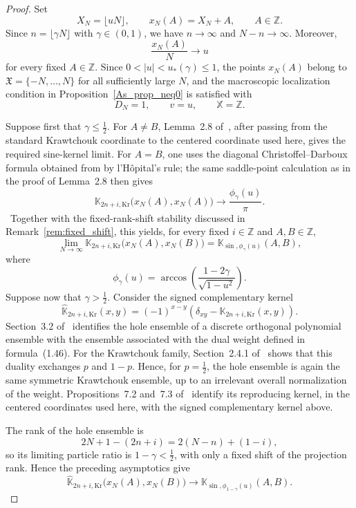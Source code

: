 \documentclass[reqno,11pt]{amsart}
\newcommand{\ZZ}{\mathbb{Z}}
\theoremstyle{plain}
\theoremstyle{definition}
\numberwithin{equation}{section}
\begin{document}
\begin{proof}
Set
\[
X_N=\lfloor uN\rfloor,
\qquad
x_N(A)=X_N+A,
\qquad
A\in\ZZ.
\]
Since \(n=\lfloor\gamma N\rfloor\) with \(\gamma\in(0,1)\), we have
\(n\to\infty\) and \(N-n\to\infty\). Moreover,
\[
\frac{x_N(A)}{N}\longrightarrow u
\]
for every fixed \(A\in\ZZ\). Since
\(0<|u|<u_\ast(\gamma)\leq1\), the points \(x_N(A)\) belong to
\(\mathfrak X=\{-N,\ldots,N\}\) for all sufficiently large \(N\),
and the macroscopic localization condition in
Proposition~\ref{As_prop_neq0} is satisfied with
\[
D_N=1,
\qquad
v=u,
\qquad
\mathbb X=\ZZ.
\]

Suppose first that \(\gamma\leq\frac12\). 
For $A\neq B$, Lemma~2.8 of~\cite{johansson2002non}, after passing from the standard Krawtchouk coordinate to the centered coordinate used here, gives the required sine-kernel limit. For $A=B$, one uses the diagonal Christoffel--Darboux formula obtained from \cite[formula~(2.7)]{johansson2002non} by l'Hôpital's rule; the same saddle-point calculation as in the proof of Lemma~2.8 then gives
\[
\mathbb K_{2n+i,\mathrm{Kr}}
\bigl(x_N(A),x_N(A)\bigr)
\longrightarrow
\frac{\phi_\gamma(u)}{\pi}.
\]
\
Together with the fixed-rank-shift stability discussed in Remark~\ref{rem:fixed_shift}, this yields, for every fixed
\(i\in\ZZ\) and \(A,B\in\ZZ\),
\[
\lim_{N\to\infty}
\mathbb K_{2n+i,\mathrm{Kr}}
\bigl(x_N(A),x_N(B)\bigr)
=
\mathbb K_{\sin,\phi_\gamma(u)}(A,B),
\]
where
\[
\phi_\gamma(u)
=
\arccos\left(
\frac{1-2\gamma}{\sqrt{1-u^2}}
\right).
\]
Suppose now that $\gamma>\frac12$. Consider the signed complementary kernel
\[
\widehat{\mathbb K}_{2n+i,\mathrm{Kr}}(x,y)
=
(-1)^{x-y}
\left(
\delta_{xy}-\mathbb K_{2n+i,\mathrm{Kr}}(x,y)
\right).
\]
Section~3.2 of~\cite{baik2007discrete} identifies the hole ensemble of a discrete orthogonal polynomial ensemble with the ensemble associated with the dual weight defined in formula~(1.46). For the Krawtchouk family, Section~2.4.1 of~\cite{baik2007discrete} shows that this duality exchanges $p$ and $1-p$. Hence, for $p=\frac12$, the hole ensemble is again the same symmetric Krawtchouk ensemble, up to an irrelevant overall normalization of the weight. Propositions~7.2 and~7.3 of~\cite{baik2007discrete} identify its reproducing kernel, in the centered coordinates used here, with the signed complementary kernel above.

The rank of the hole ensemble is
\[
2N+1-(2n+i)
=
2(N-n)+(1-i),
\]
so its limiting particle ratio is
\(1-\gamma<\frac12\), with only a fixed shift of the projection rank.
Hence the preceding asymptotics give
\[
\widehat{\mathbb K}_{2n+i,\mathrm{Kr}}
\bigl(x_N(A),x_N(B)\bigr)
\longrightarrow
\mathbb K_{\sin,\phi_{1-\gamma}(u)}(A,B).
\]


\end{proof}
\end{document}
